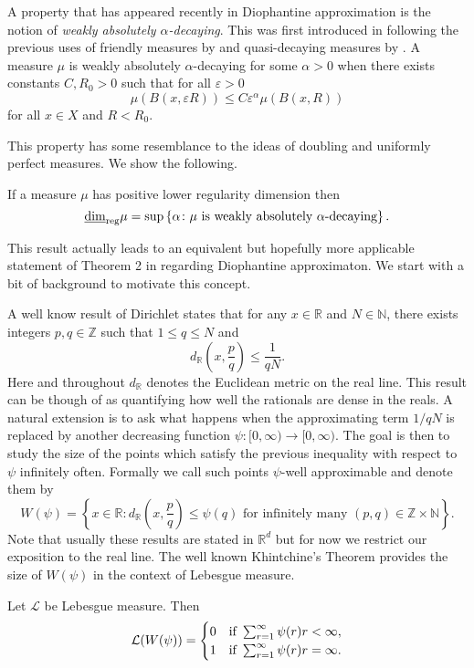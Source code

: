 A property that has appeared recently in Diophantine approximation is the notion of \textit{weakly absolutely $\alpha$-decaying}. This was first introduced in \cite{beres-sanju-al} following the previous uses of friendly measures by \cite{friendly} and quasi-decaying measures by \cite{decaying1, decaying2}. A measure $\mu$ is weakly absolutely $\alpha$-decaying for some $\alpha > 0$ when there exists constants $C, R_0 >0$ such that for all $\varepsilon > 0$
\[
\mu(B(x,\varepsilon R)) \le C \varepsilon^{\alpha} \mu(B(x,R))
\]
for all $x \in X$ and $R<R_0$.

This property has some resemblance to the ideas of doubling and uniformly perfect measures. We show the following.
\begin{proposition}\label{ch-quantifying:equiv-diophantine}
	If a measure $\mu$ has positive lower regularity dimension then 
	\[
	\underline{\dim}_{\textup{reg}} \mu = \sup\left\{\alpha \colon \mu \text{ is weakly absolutely $\alpha$-decaying}\right\}.
	\]
\end{proposition}

This result actually leads to an equivalent but hopefully more applicable statement of Theorem 2 in \cite{beres-sanju-al} regarding Diophantine approximaton. We start with a bit of background to motivate this concept.

A well know result of Dirichlet states that for any $x \in \mathbb{R}$ and $N \in \mathbb{N}$, there exists integers $p, q \in \mathbb{Z}$ such that $1 \le q \le N $ and 
\[
d_{\mathbb{R}}\left( x , \frac{p}{q} \right) \le \frac{1}{qN}.
\]
Here and throughout $d_{\mathbb{R}}$ denotes the Euclidean metric on the real line. This result can be though of as quantifying how well the rationals are dense in the reals. A natural extension is to ask what happens when the approximating term $1/qN$ is replaced by another decreasing function $\psi \colon [0,\infty) \rightarrow [0,\infty)$. The goal is then to study the size of the points which satisfy the previous inequality with respect to $\psi$ infinitely often. Formally we call such points $\psi$-well approximable and denote them by 
\[
W(\psi) = \left\{x \in \mathbb{R} \colon d_{\mathbb{R}}\left( x , \frac{p}{q} \right) \le \psi(q) \text{ for infinitely many } (p,q) \in \mathbb{Z} \times \mathbb{N}  \right\}.
\]
Note that usually these results are stated in $\mathbb{R}^d$ but for now we restrict our exposition to the real line. The well known Khintchine's Theorem provides the size of $W(\psi)$ in the context of Lebesgue measure.
\begin{theorem}
    Let $\mathcal{L}$ be Lebesgue measure. Then
    \[
    \mathcal{L}(W(\psi)) = \begin{cases} 
      0 & \textup{if }   \sum_{r=1}^{\infty}\psi(r)r < \infty, \\
      1 & \textup{if }   \sum_{r=1}^{\infty}\psi(r)r = \infty.
   \end{cases}
    \]
\end{theorem}

